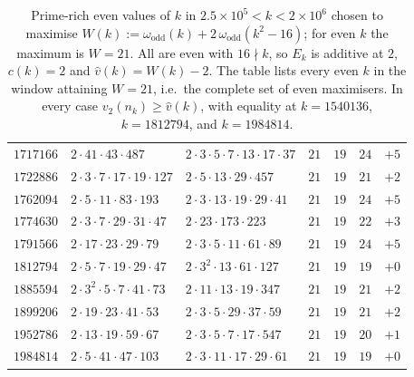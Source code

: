 \documentclass[12pt]{amsart}%
\newcommand{\1}{\mathds{1}}
\theoremstyle{definition}
\numberwithin{equation}{section}
\numberwithin{table}{section}
\numberwithin{figure}{section}
\begin{document}
\begin{table}[htbp]
\begin{tabular}{r l l c c c c}
$1717166$ & $2\cdot41\cdot43\cdot487$                & $2\cdot3\cdot5\cdot7\cdot13\cdot17\cdot37$ & $21$ & $19$ & $24$ & $+5$\\
$1722886$ & $2\cdot3\cdot7\cdot17\cdot19\cdot127$    & $2\cdot5\cdot13\cdot29\cdot457$         & $21$ & $19$ & $21$ & $+2$\\
$1762094$ & $2\cdot5\cdot11\cdot83\cdot193$          & $2\cdot3\cdot13\cdot19\cdot29\cdot41$   & $21$ & $19$ & $24$ & $+5$\\
$1774630$ & $2\cdot3\cdot7\cdot29\cdot31\cdot47$     & $2\cdot23\cdot173\cdot223$             & $21$ & $19$ & $22$ & $+3$\\
$1791566$ & $2\cdot17\cdot23\cdot29\cdot79$          & $2\cdot3\cdot5\cdot11\cdot61\cdot89$    & $21$ & $19$ & $24$ & $+5$\\
$1812794$ & $2\cdot5\cdot7\cdot19\cdot29\cdot47$     & $2\cdot3^{2}\cdot13\cdot61\cdot127$     & $21$ & $19$ & $19$ & $+0$\\
$1885594$ & $2\cdot3^{2}\cdot5\cdot7\cdot41\cdot73$  & $2\cdot11\cdot13\cdot19\cdot347$        & $21$ & $19$ & $21$ & $+2$\\
$1899206$ & $2\cdot19\cdot23\cdot41\cdot53$          & $2\cdot3\cdot5\cdot29\cdot37\cdot59$    & $21$ & $19$ & $21$ & $+2$\\
$1952786$ & $2\cdot13\cdot19\cdot59\cdot67$          & $2\cdot3\cdot5\cdot7\cdot17\cdot547$    & $21$ & $19$ & $20$ & $+1$\\
$1984814$ & $2\cdot5\cdot41\cdot47\cdot103$          & $2\cdot3\cdot11\cdot17\cdot29\cdot61$   & $21$ & $19$ & $19$ & $+0$\\
\bottomrule
\end{tabular}
\caption{Prime-rich even values of $k$ in $2.5\times10^{5}<k<2\times10^{6}$ chosen to
maximise $W(k):=\omega_{\mathrm{odd}}(k)+2\,\omega_{\mathrm{odd}}(k^2-16)$; for even $k$
the maximum is $W=21$. All are even with $16\nmid k$, so $E_k$ is additive at $2$,
$c(k)=2$ and $\hat v(k)=W(k)-2$. The table lists every even $k$ in the window attaining
$W=21$, i.e.\ the complete set of even maximisers. In every case $v_2(n_k)\ge\hat v(k)$,
with equality at $k=1540136$, $k=1812794$, and $k=1984814$.}
\label{tab:largeW-even}
\end{table}


\clearpage



\end{document}
